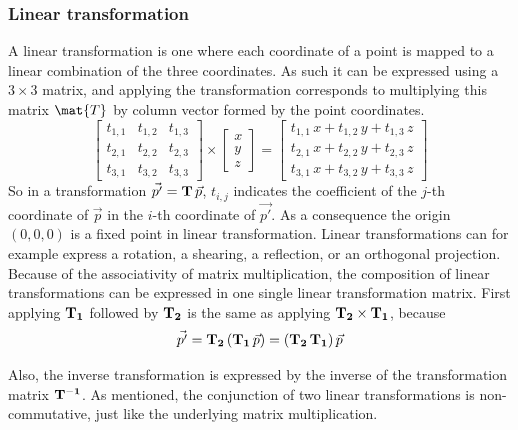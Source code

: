 \subsubsection{Linear transformation}
A linear transformation is one where each coordinate of a point is mapped to a linear combination of the three coordinates. As such it can be expressed using a $3 \times 3$ matrix, and applying the transformation corresponds to multiplying this matrix $\mat{T}$ by column vector formed by the point coordinates.
\begin{equation}
\left[ \begin{matrix}
	t_{1,1} & t_{1,2} & t_{1,3} \\
	t_{2,1} & t_{2,2} & t_{2,3} \\
	t_{3,1} & t_{3,2} & t_{3,3}
\end{matrix} \right] \times
\left[ \begin{matrix} x \\ y \\ z \end{matrix} \right] = 
\left[ \begin{matrix}
	t_{1,1} \, x + t_{1,2} \, y + t_{1,3} \, z \\
	t_{2,1} \, x + t_{2,2} \, y + t_{2,3} \, z \\
	t_{3,1} \, x + t_{3,2} \, y + t_{3,3} \, z
\end{matrix} \right]
\end{equation}
So in a transformation $\vec{p'} = \mathbf{T} \, \vec{p}$, $t_{i,j}$ indicates the coefficient of the $j$-th coordinate of $\vec{p}$ in the $i$-th coordinate of $\vec{p'}$. As a consequence the origin $(0, 0, 0)$ is a fixed point in linear transformation. Linear transformations can for example express a rotation, a shearing, a reflection, or an orthogonal projection. Because of the associativity of matrix multiplication, the composition of linear transformations can be expressed in one single linear transformation matrix. First applying $\mathbf{T_1}$ followed by $\mathbf{T_2}$ is the same as applying $\mathbf{T_2} \times \mathbf{T_1}$, because
\begin{equation}
	\vec{p'} = \mathbf{T_2} \, ( \mathbf{T_1} \, \vec{p} ) = (\mathbf{T_2} \, \mathbf{T_1}) \, \vec{p}
\end{equation}

Also, the inverse transformation is expressed by the inverse of the transformation matrix $\mathbf{T^{-1}}$. As mentioned, the conjunction of two linear transformations is non-commutative, just like the underlying matrix multiplication.

